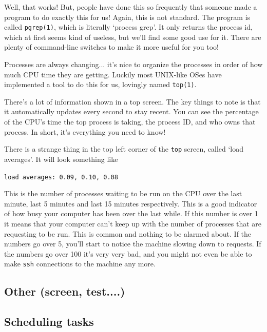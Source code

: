 Well, that works! But, people have done this so frequently that someone made a program
to do exactly this for us! Again, this is not standard. The program is called {\tt pgrep(1)},
which is literally `process grep'. It only returns the process id, which at first seems kind of useless,
but we'll find some good use for it. There are plenty of command-line switches to make it 
more useful for you too!

Processes are always changing... it's nice to organize the processes in order 
of how much CPU time they are getting. Luckily most UNIX-like OSes have implemented a
tool to do this for us, lovingly named {\tt top(1)}.


There's a lot of information shown in a top screen. The key things to note is that
it automatically updates every second to stay recent. You can see the 
percentage of the CPU's time the top process is taking, the process ID, and who owns that process.
In short, it's everything you need to know!

There is a strange thing in the top left corner of the {\tt top} screen, called `load averages'.
It will look something like

{\tt load averages: 0.09, 0.10, 0.08}

This is the number of processes waiting to be run on the CPU over the last minute, last 5 minutes and last 15 minutes respectively.
This is a good indicator of how busy your computer has been over the last while. If this number is over 1 it means that your computer
can't keep up with the number of processes that are requesting to be run. This is common and nothing to be alarmed about. If the 
numbers go over 5, you'll start to notice the machine slowing down to requests. If the numbers go over 100 it's very
very bad, and you might not even be able to make {\tt ssh} connections to the machine any more.


			
\subsection {Other (screen, test....) }


\subsection	{Scheduling tasks  }

